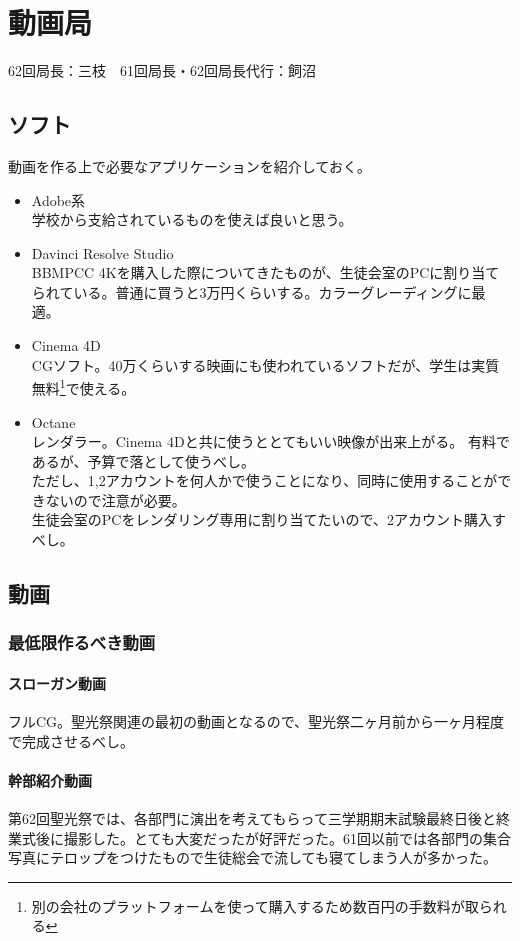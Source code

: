 \documentclass[a4paper]{ltjsreport}
\newcommand{\Chapter}[1]{\chapter{#1}\thispagestyle{fancy}}
\begin{document}
\Chapter{動画局}
62回局長：三枝　61回局長・62回局長代行：飼沼
\section{ソフト}
動画を作る上で必要なアプリケーションを紹介しておく。
\begin{itemize}
  \item Adobe系\\
        学校から支給されているものを使えば良いと思う。
  \item Davinci Resolve Studio\\
        BBMPCC 4Kを購入した際についてきたものが、生徒会室のPCに割り当てられている。普通に買うと3万円くらいする。カラーグレーディングに最適。
  \item Cinema 4D\\
        CGソフト。40万くらいする映画にも使われているソフトだが、学生は実質無料\footnote{別の会社のプラットフォームを使って購入するため数百円の手数料が取られる}で使える。
  \item Octane\\
        レンダラー。Cinema 4Dと共に使うととてもいい映像が出来上がる。
        有料であるが、予算で落として使うべし。\\ただし、1,2アカウントを何人かで使うことになり、同時に使用することができないので注意が必要。\\生徒会室のPCをレンダリング専用に割り当てたいので、2アカウント購入すべし。
\end{itemize}
\newpage
\section{動画}
\subsection{最低限作るべき動画}
\subsubsection{スローガン動画}
フルCG。聖光祭関連の最初の動画となるので、聖光祭二ヶ月前から一ヶ月程度で完成させるべし。
\subsubsection{幹部紹介動画}
第62回聖光祭では、各部門に演出を考えてもらって三学期期末試験最終日後と終業式後に撮影した。とても大変だったが好評だった。61回以前では各部門の集合写真にテロップをつけたもので生徒総会で流しても寝てしまう人が多かった。
\end{document}
